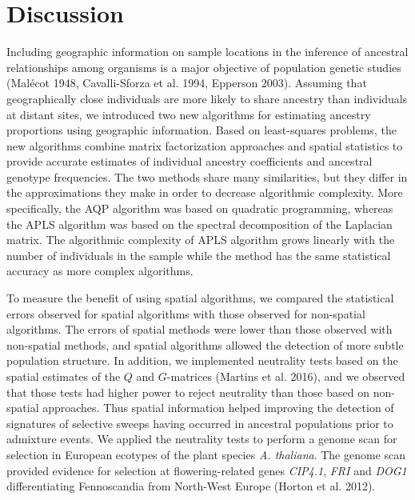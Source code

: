 \clearpage
\newpage



\section{Discussion}

Including geographic information on sample locations in the inference of ancestral relationships among  organisms is a major objective of population genetic studies (Mal\'ecot 1948, Cavalli-Sforza et al. 1994, Epperson 2003). Assuming that geographically close individuals are more likely to share ancestry than individuals at distant sites, we introduced two new  algorithms for estimating ancestry proportions using geographic information. Based on least-squares problems, the new algorithms combine matrix factorization approaches and spatial statistics to provide accurate estimates of individual ancestry coefficients and ancestral genotype frequencies. The two methods share many similarities, but they differ in the approximations they make in order to decrease algorithmic complexity.  More specifically, the AQP algorithm was based on quadratic programming, whereas the APLS algorithm was based on the spectral decomposition of the Laplacian matrix. The algorithmic complexity of APLS algorithm grows linearly with the number of individuals in the sample while the method has the same statistical accuracy as more complex algorithms. 


To measure the benefit of using spatial algorithms, we compared the statistical errors observed for spatial algorithms with those observed for non-spatial algorithms. The errors of spatial methods were lower than those observed  with non-spatial methods, and spatial algorithms allowed the detection of more subtle population structure. In addition, we implemented neutrality tests based on the spatial estimates of the $Q$ and $G$-matrices (Martins et al. 2016), and we observed that those tests had higher power to reject neutrality than those based on non-spatial approaches. Thus spatial information helped improving the detection of signatures of selective sweeps having occurred  in ancestral populations prior to admixture events. We applied the neutrality tests to perform a genome scan for selection in European ecotypes of the plant species {\it A. thaliana}. The genome scan provided evidence for selection at flowering-related genes {\it CIP4.1}, {\it FRI} and {\it DOG1} differentiating Fennoscandia from North-West Europe (Horton et al. 2012).


